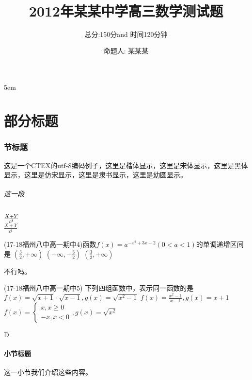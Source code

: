 \documentclass[12pt,UTF8]{ctexart}
\begin{document}
\title{2012年某某中学高三数学测试题}
\author{总分:150分and 时间120分钟}
\date{命题人: 某某某}
\maketitle

\setlength{\parskip} {5em}
\setlength\parindent{2em}
\part{部分标题}
\section{节标题}
这是一个CTEX的utf-8编码例子，{\kai 这里是楷体显示}，{\songti 这里是宋体显示}，{\heiti 这里是黑体显示}，{\fangsong 这里是仿宋显示}，{\lishu 这里是隶书显示}，{\youyuan 这里是幼圆显示}。
\paragraph{这一段}
$X+Y\over c^t$\\
$\frac{X+Y}{c^t}$
\startexercise
\begin{exercise}
\item (17-18福州八中高一期中4)函数$f(x)=a^{-x^2+3x+2}(0<a<1)$的单调递增区间是\xz
        {$(\frac32,+\infty)$}
        {$(-\infty,-\frac32)$}
        {$(\frac32,+\infty)$}
\begin{answer}
不行吗。
\end{answer}
\item  (17-18福州八中高一期中5) 下列四组函数中，表示同一函数的是\xz
        {$f(x)=\sqrt{x+1}\cdot\sqrt{x-1},g(x)=\sqrt{x^2-1}$}
        {$f(x)=\frac{x^2-1}{x-1},g(x)=x+1$}
        {$f(x)=\begin{cases}x,x\geq0\\-x,x<0\end{cases},g(x)=\sqrt{x^2}$}
\begin{answer}
D
\end{answer}
\subsection{小节标题}这一小节我们介绍这些内容。
\end{exercise}
\end{document}
